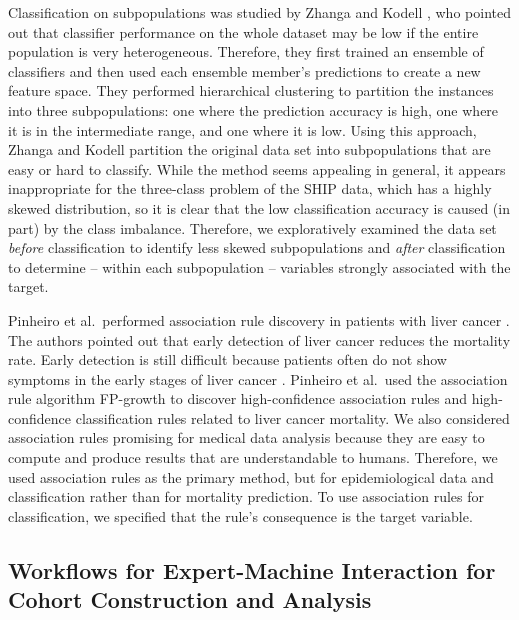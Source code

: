 \documentclass[
  oneside]{book}
\begin{document}
Classification on subpopulations was studied by Zhanga and Kodell \autocite{AIM13}, who pointed out that classifier performance on the whole dataset may be low if the entire population is very heterogeneous.
Therefore, they first trained an ensemble of classifiers and then used each ensemble member's predictions to create a new feature space.
They performed hierarchical clustering to partition the instances into three subpopulations: one where the prediction accuracy is high, one where it is in the intermediate range, and one where it is low.
Using this approach, Zhanga and Kodell partition the original data set into subpopulations that are easy or hard to classify.
While the method seems appealing in general, it appears inappropriate for the three-class problem of the SHIP data, which has a highly skewed distribution, so it is clear that the low classification accuracy is caused (in part) by the class imbalance.
Therefore, we exploratively examined the data set \emph{before} classification to identify less skewed subpopulations and \emph{after} classification to determine -- within each subpopulation -- variables strongly associated with the target.

Pinheiro et al.~performed association rule discovery in patients with liver cancer \autocite{PinheiroEtAl:ICCABS13}.
The authors pointed out that early detection of liver cancer reduces the mortality rate.
Early detection is still difficult because patients often do not show symptoms in the early stages of liver cancer \autocite{PinheiroEtAl:ICCABS13}.
Pinheiro et al.~used the association rule algorithm FP-growth \autocite{Han:FPGrowth00} to discover high-confidence association rules and high-confidence classification rules related to liver cancer mortality.
We also considered association rules promising for medical data analysis because they are easy to compute and produce results that are understandable to humans.
Therefore, we used association rules as the primary method, but for epidemiological data and classification rather than for mortality prediction.
To use association rules for classification, we specified that the rule's consequence is the target variable.

\hypertarget{workflows-for-expert-machine-interaction-for-cohort-construction-and-analysis}{%
\subsection{Workflows for Expert-Machine Interaction for Cohort Construction and Analysis}\label{workflows-for-expert-machine-interaction-for-cohort-construction-and-analysis}}
\end{document}
